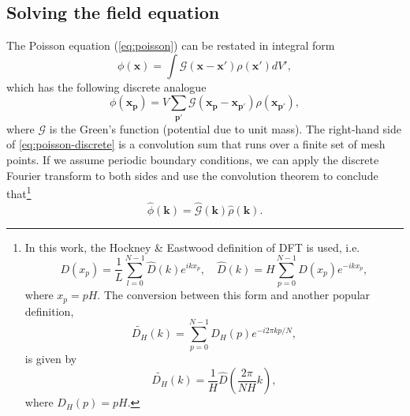 \subsection{Solving the field equation}
The Poisson equation (\autoref{eq:poisson}) can be restated in integral form
\begin{equation*}
    \phi(\mathbf{x}) = \int \mathcal{G}(\mathbf{x}-\mathbf{x}')\rho(\mathbf{x}') dV',
\end{equation*}
which has the following discrete analogue
\begin{equation}\label{eq:poisson-discrete}
    \phi(\mathbf{x}_\mathbf{p}) = V \sum_{\mathbf{p}'} \mathcal{G}(\mathbf{x}_\mathbf{p} - \mathbf{x}_{\mathbf{p}'}) \rho(\mathbf{x}_{\mathbf{p}'}),
\end{equation}
where $\mathcal{G}$ is the Green's function (potential due to unit mass).
The right-hand side of \autoref{eq:poisson-discrete} is a convolution sum that runs over a finite set of mesh points.
If we assume periodic boundary conditions, we can apply the discrete Fourier transform to both sides and use the convolution theorem to conclude that\footnote{
    In this work, the Hockney \& Eastwood definition of DFT is used, i.e.
    \begin{equation*}
        D(x_p) = \frac{1}{L}\sum_{l=0}^{N-1}\hat{D}(k)e^{ikx_p}, \quad \hat{D}(k) = H\sum_{p=0}^{N-1}D(x_p)e^{-ikx_p},
    \end{equation*}
    where $x_p = pH$.
    The conversion between this form and another popular definition,
    \begin{equation}\label{eq:standard-dft}
        \widetilde{D_H}(k) = \sum_{p=0}^{N-1}D_H(p)e^{-i2\pi kp / N},
    \end{equation}
    is given by
    \begin{equation*}
        \widetilde{D_H}(k) = \frac{1}{H}\hat{D}\left(\frac{2\pi}{NH}k\right),
    \end{equation*}
    where $D_H(p) = pH$.
}
\begin{equation}\label{eq:poisson-fourier-product}
    \hat{\phi}(\mathbf{k}) = \hat{\mathcal{G}}(\mathbf{k}) \hat{\rho}(\mathbf{k}).
\end{equation}

